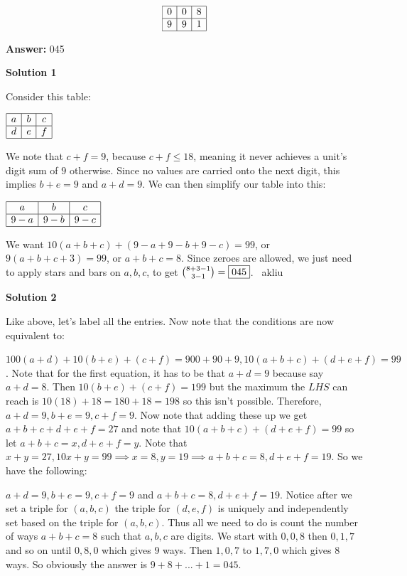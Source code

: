 \begin{enumerate}
 
 \[\begin{array}{|c|c|c|} \hline 0 & 0 & 8 \\ \hline 9 & 9 & 1 \\ \hline \end{array}\]

 \textbf{Answer: }045



\textbf{Solution 1}

Consider this table:

 $\begin{array}{|c|c|c|} \hline a & b & c \\ \hline d & e & f\\ \hline \end{array}$

 We note that $c+f = 9$, because $c+f \leq 18$, meaning it never achieves a unit's digit sum of $9$ otherwise. Since no values are carried onto the next digit, this implies $b+e=9$ and $a+d=9$. We can then simplify our table into this:

 $\begin{array}{|c|c|c|} \hline a & b & c \\ \hline 9-a & 9-b & 9-c \\ \hline \end{array}$

 We want $10(a+b+c) + (9-a+9-b+9-c) = 99$, or $9(a+b+c+3) = 99$, or $a+b+c=8$. Since zeroes are allowed, we just need to apply stars and bars on $a, b, c$, to get $\tbinom{8+3-1}{3-1} = \boxed{045}$. ~akliu

 



\textbf{Solution 2}

Like above, let's label all the entries. Now note that the conditions are now equivalent to: 

 $100(a + d) + 10(b + e) + (c + f) = 900 + 90 + 9, 10(a + b + c) + (d + e + f) = 99$. Note that for the first equation, it has to be that $a + d = 9$ because say $a + d = 8$. Then $10(b + e) + (c + f) = 199$ but the maximum the $LHS$ can reach is $10(18) + 18 = 180 + 18 = 198$ so this isn't possible. Therefore, $a + d = 9, b + e = 9, c + f = 9$. Now note that adding these up we get $a + b + c + d + e + f = 27$ and note that $10(a + b + c) + (d + e + f) = 99$ so let $a + b + c = x, d + e + f = y$. Note that $x + y = 27, 10x + y = 99 \implies x = 8, y = 19 \implies a + b + c = 8, d + e + f = 19$. So we have the following:

 $a + d = 9, b + e = 9, c + f = 9$ and $a + b + c = 8, d + e + f = 19$. Notice after we set a triple for $(a, b, c)$ the triple for $(d, e, f)$ is uniquely and independently set based on the triple for $(a, b, c)$. Thus all we need to do is count the number of ways $a + b + c = 8$ such that $a, b, c$ are digits. We start with $0, 0, 8$ then $0, 1, 7$ and so on until $0, 8, 0$ which gives $9$ ways. Then $1, 0, 7$ to $1, 7, 0$ which gives $8$ ways. So obviously the answer is $9 + 8 + ... + 1 = \boxed{045}$.


\end{enumerate}

